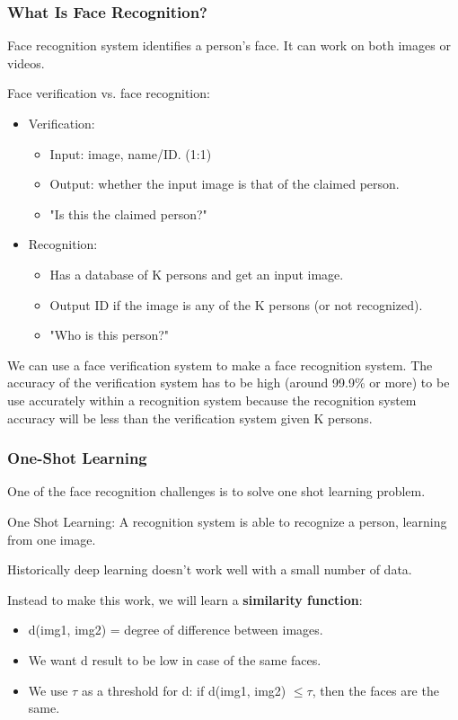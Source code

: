 \subsubsection{What Is Face Recognition?}
Face recognition system identifies a person's face. It can work on both images or videos.

Face verification vs. face recognition:

\begin{itemize}
    \item Verification:
    \begin{itemize}
        \item Input: image, name/ID. (1:1)
        \item Output: whether the input image is that of the claimed person.
        \item "Is this the claimed person?"
    \end{itemize}
    \item Recognition:
    \begin{itemize}
        \item Has a database of K persons and get an input image.
        \item Output ID if the image is any of the K persons (or not recognized).
        \item "Who is this person?"
    \end{itemize}
\end{itemize}

We can use a face verification system to make a face recognition system. The accuracy of the verification system has to be high (around 99.9\% or more) to be use accurately within a recognition system because the recognition system accuracy will be less than the verification system given K persons.

\subsubsection{One-Shot Learning}
One of the face recognition challenges is to solve one shot learning problem.

One Shot Learning: A recognition system is able to recognize a person, learning from one image.

Historically deep learning doesn't work well with a small number of data.

Instead to make this work, we will learn a \textbf{similarity function}:
\begin{itemize}
    \item d(img1, img2) = degree of difference between images.
    \item We want d result to be low in case of the same faces.
    \item We use $\tau$ as a threshold for d: if d(img1, img2) $\leq \tau$, then the faces are the same.
\end{itemize}

